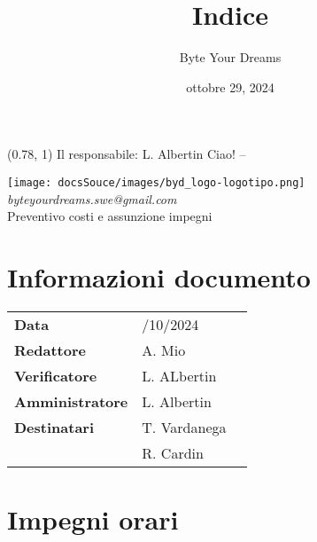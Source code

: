\documentclass{article}
\title{\textbf{\fontsize{28}{6}\selectfont Indice}}
\author{\fontsize{14}{6}\selectfont Byte Your Dreams}
\date{ottobre 29, 2024}
\begin{document}
\begin{textblock*}{\textwidth}(0.78\textwidth, 1\textheight)
    Il responsabile: L. Albertin Ciao! --
\end{textblock*}
\pagestyle{fancy}
\begin{center}
\vspace*{-2cm}
\texttt{[image: docsSouce/images/byd\_logo-logotipo.png]}
\fontsize{12}{6}\textcolor[RGB]{60, 60, 60}{\textit{byteyourdreams.swe@gmail.com}} \\
\vspace{0.5cm}
\fontsize{16}{6}\selectfont Preventivo costi e assunzione impegni \\
\vspace{0.5cm}
\end{center}

\section*{Informazioni documento}
\def\arraystretch{1.2}
\begin{tabular}{>{\raggedleft\arraybackslash}p{}|>{\raggedright\arraybackslash}p{}c}
\hline
\addlinespace
\textbf{Data} & 29/10/2024 \vspace{10pt} \\
\textbf{Redattore} & A. Mio \vspace{10pt} \\
\textbf{Verificatore} & L. ALbertin \vspace{10pt} \\
\textbf{Amministratore} & L. Albertin \vspace{10pt} \\
\textbf{Destinatari} & T. Vardanega \\ & R. Cardin \vspace{10pt}
\end{tabular}

\pagebreak 





\flushleft

\section{Impegni orari}
\end{document}
